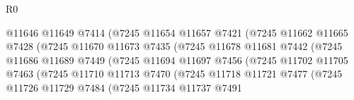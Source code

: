 \begin{lexlean}{R0}
\begin{coremodule}
                                      @11646
                                      @11649
                                      @7414
                                      (@7245
                                        @11654
                                        @11657
                                        @7421
                                        (@7245
                                          @11662
                                          @11665
                                          @7428
                                          (@7245
                                            @11670
                                            @11673
                                            @7435
                                            (@7245
                                              @11678
                                              @11681
                                              @7442
                                              (@7245
                                                @11686
                                                @11689
                                                @7449
                                                (@7245
                                                  @11694
                                                  @11697
                                                  @7456
                                                  (@7245
                                                    @11702
                                                    @11705
                                                    @7463
                                                    (@7245
                                                      @11710
                                                      @11713
                                                      @7470
                                                      (@7245
                                                        @11718
                                                        @11721
                                                        @7477
                                                        (@7245
                                                          @11726
                                                          @11729
                                                          @7484
                                                          (@7245
                                                            @11734
                                                            @11737
                                                            @7491

\end{coremodule}
\end{lexlean}
